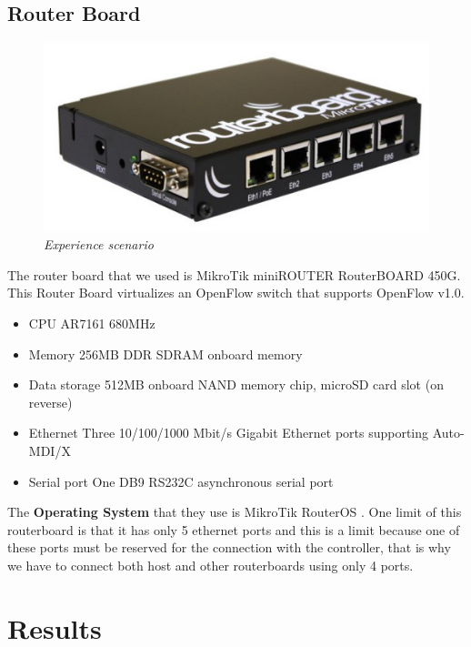 \documentclass[article,10pt]{IEEEtran}
\begin{document}
\subsection{Router Board}
\begin{figure}[!h]
  \centering
  \includegraphics[scale=0.30]{images/rboard.png}
  \caption{\emph{Experience scenario}}
  \label{fig:topo}
\end{figure}

The router board that we used is MikroTik miniROUTER RouterBOARD 450G. This Router Board virtualizes an OpenFlow switch that supports
OpenFlow v1.0\cite{routerboard_doc}.
\begin{itemize}
   \item CPU		AR7161 680MHz
   \item Memory		256MB DDR SDRAM onboard memory
   \item Data storage	512MB onboard NAND memory chip, microSD card slot (on reverse)
   \item Ethernet 	Three 10/100/1000 Mbit/s Gigabit Ethernet ports supporting Auto-MDI/X
   \item Serial port 	One DB9 RS232C asynchronous serial port
\end{itemize}

The \textbf{Operating System} that they use is MikroTik RouterOS \cite{routeboard_software}.
\newline
One limit of this routerboard is that it has only 5 ethernet ports and this is a limit because one of these ports must be
reserved for the connection with the controller, that is why we have to connect both host and other routerboards using only 4 ports.

\section{Results}\label{sec:results}
\end{document}
